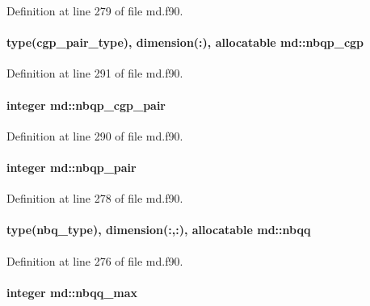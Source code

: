 Definition at line 279 of file md.\-f90.

\hypertarget{classmd_aad111b28d02d9cca0481c8841da0864a}{
\paragraph[{nbqp\-\_\-cgp}]{\setlength{\rightskip}{0pt plus 5cm}type({\bf cgp\-\_\-pair\-\_\-type}), dimension(\-:), allocatable md\-::nbqp\-\_\-cgp}}\label{classmd_aad111b28d02d9cca0481c8841da0864a}


Definition at line 291 of file md.\-f90.

\hypertarget{classmd_a1463121ef43a1891ee0f918e61e2fdd2}{
\paragraph[{nbqp\-\_\-cgp\-\_\-pair}]{\setlength{\rightskip}{0pt plus 5cm}integer md\-::nbqp\-\_\-cgp\-\_\-pair}}\label{classmd_a1463121ef43a1891ee0f918e61e2fdd2}


Definition at line 290 of file md.\-f90.

\hypertarget{classmd_a3700e000587436c6cbba686979bf24bb}{
\paragraph[{nbqp\-\_\-pair}]{\setlength{\rightskip}{0pt plus 5cm}integer md\-::nbqp\-\_\-pair}}\label{classmd_a3700e000587436c6cbba686979bf24bb}


Definition at line 278 of file md.\-f90.

\hypertarget{classmd_a1b7227f6d44f695169102680b62973a0}{
\paragraph[{nbqq}]{\setlength{\rightskip}{0pt plus 5cm}type({\bf nbq\-\_\-type}), dimension(\-:,\-:), allocatable md\-::nbqq}}\label{classmd_a1b7227f6d44f695169102680b62973a0}


Definition at line 276 of file md.\-f90.

\hypertarget{classmd_a14bafb566028a8a6aa64a8c8a05da277}{
\paragraph[{nbqq\-\_\-max}]{\setlength{\rightskip}{0pt plus 5cm}integer md\-::nbqq\-\_\-max}}\label{classmd_a14bafb566028a8a6aa64a8c8a05da277}


